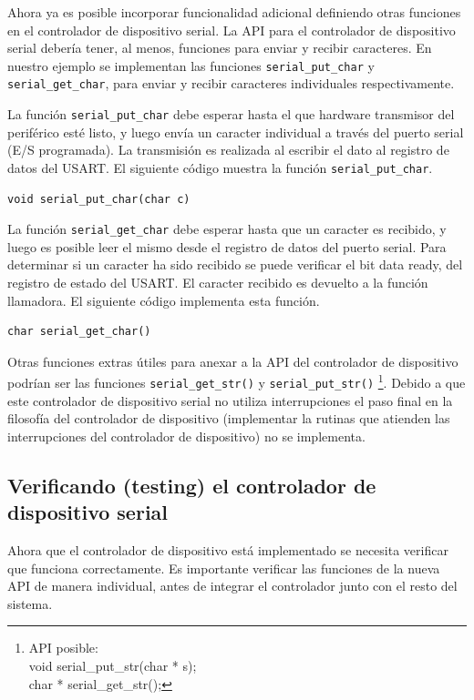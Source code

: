 \documentclass[output=paper, 
colorlinks,
citecolor=brown,
newtxmath
]{langscibook}
\begin{document}
Ahora ya es posible incorporar funcionalidad adicional definiendo otras
funciones en el controlador de dispositivo serial.
La API para el controlador de dispositivo serial debería tener, al menos,
funciones para enviar y recibir caracteres. En nuestro ejemplo
se implementan las funciones \texttt{serial\_put\_char} y \texttt{serial\_get\_char}, 
para enviar y recibir caracteres individuales respectivamente.


La función \texttt{serial\_put\_char} debe esperar hasta el que hardware
transmisor del periférico esté listo, y 
luego envía un caracter individual a través del puerto serial (E/S programada).
La transmisión es realizada al escribir el dato al registro de datos del USART.
El siguiente código muestra la función \texttt{serial\_put\_char}.

\begin{verbatim}
void serial_put_char(char c)
\end{verbatim}


La función \texttt{serial\_get\_char} debe esperar hasta que un caracter es recibido, y 
luego es posible leer el mismo desde el registro de datos del puerto serial. 
Para determinar si un caracter ha sido recibido se puede verificar
el bit data ready, del registro de estado del USART. El caracter
recibido es devuelto a la función llamadora. 
El siguiente código implementa esta función.


\begin{verbatim}
char serial_get_char()
\end{verbatim}

Otras funciones extras útiles para anexar a la API del controlador
de dispositivo podrían ser las funciones \texttt{serial\_get\_str()} y \texttt{serial\_put\_str()}
\footnote{API posible: \\ void serial\_put\_str(char * s); \\
char * serial\_get\_str();}.
Debido a que este controlador de dispositivo serial no utiliza interrupciones
el paso final en la filosofía del controlador de dispositivo (implementar
la rutinas que atienden las interrupciones del controlador de dispositivo)
no se implementa.


\subsection *{Verificando (testing) el controlador de dispositivo serial}

Ahora que el controlador de dispositivo está implementado se necesita verificar
que funciona correctamente. Es importante verificar las funciones de la nueva
API de manera individual, 
antes de integrar el controlador junto con el resto del sistema.
\end{document}
